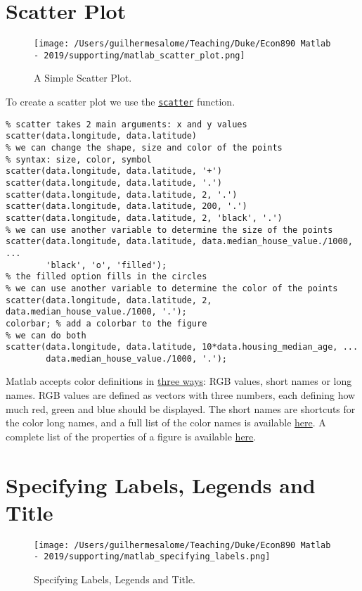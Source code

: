 \documentclass[12pt, a4paper]{article}
\begin{document}
\section{Scatter Plot}
\label{sec:org716b43a}
\begin{figure}[H]
\centering
\texttt{[image: /Users/guilhermesalome/Teaching/Duke/Econ890 Matlab - 2019/supporting/matlab\_scatter\_plot.png]}
\caption{\label{fig:orgab460eb}
A Simple Scatter Plot.}
\end{figure}

To create a scatter plot we use the \href{https://www.mathworks.com/help/matlab/ref/scatter.html}{\texttt{scatter}} function.
\lstset{language=matlab,label= ,caption= ,captionpos=b,firstnumber=1,numbers=left,style=Matlab-editor}
\begin{lstlisting}
% scatter takes 2 main arguments: x and y values
scatter(data.longitude, data.latitude)
% we can change the shape, size and color of the points
% syntax: size, color, symbol
scatter(data.longitude, data.latitude, '+')
scatter(data.longitude, data.latitude, '.')
scatter(data.longitude, data.latitude, 2, '.')
scatter(data.longitude, data.latitude, 200, '.')
scatter(data.longitude, data.latitude, 2, 'black', '.')
% we can use another variable to determine the size of the points
scatter(data.longitude, data.latitude, data.median_house_value./1000, ...
        'black', 'o', 'filled');
% the filled option fills in the circles
% we can use another variable to determine the color of the points
scatter(data.longitude, data.latitude, 2, data.median_house_value./1000, '.');
colorbar; % add a colorbar to the figure
% we can do both
scatter(data.longitude, data.latitude, 10*data.housing_median_age, ...
        data.median_house_value./1000, '.');
\end{lstlisting}
Matlab accepts color definitions in \href{https://www.mathworks.com/help/matlab/ref/colorspec.html}{three ways}: RGB values, short names or long names.
RGB values are defined as vectors with three numbers, each defining how much red, green and blue should be displayed.
The short names are shortcuts for the color long names, and a full list of the color names is available \href{https://www.mathworks.com/help/matlab/ref/colorspec.html}{here}.
A complete list of the properties of a figure is available \href{https://www.mathworks.com/help/matlab/ref/matlab.ui.figure-properties.html}{here}.
\section{Specifying Labels, Legends and Title}
\label{sec:orgeefb934}
\begin{figure}[H]
\centering
\texttt{[image: /Users/guilhermesalome/Teaching/Duke/Econ890 Matlab - 2019/supporting/matlab\_specifying\_labels.png]}
\caption{\label{fig:org8b9713a}
Specifying Labels, Legends and Title.}
\end{figure}
\end{document}
